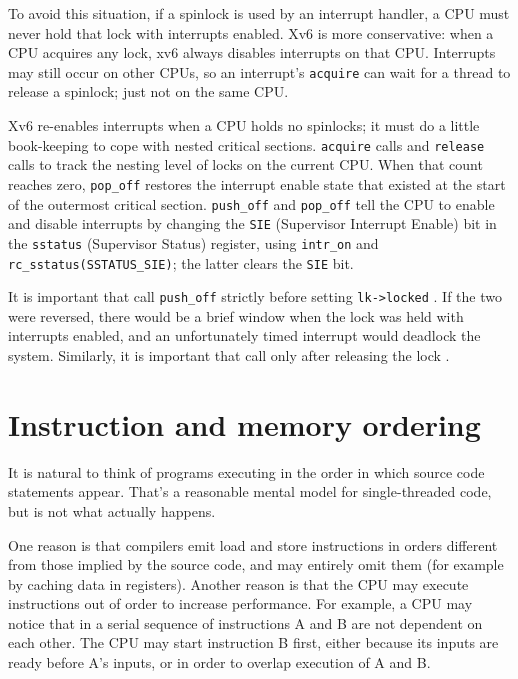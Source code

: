 To avoid this situation, if a spinlock is used by an interrupt handler,
a CPU must never hold that lock with interrupts enabled.
Xv6 is more conservative: when a CPU acquires any
lock, xv6 always disables interrupts on that CPU.
Interrupts may still occur on other CPUs, so 
an interrupt's
\lstinline{acquire}
can wait for a thread to release a spinlock; just not on the same CPU.

Xv6 re-enables interrupts when a CPU holds no spinlocks; it must
do a little book-keeping to cope with nested critical sections.
\lstinline{acquire}
calls
and
\lstinline{release}
calls
to track the nesting level of locks on the current CPU.
When that count reaches zero,
\lstinline{pop_off} 
restores the interrupt enable state that existed 
at the start of the outermost critical section.
\lstinline{push_off} and \lstinline{pop_off} tell the CPU to enable
and disable interrupts by changing the \lstinline{SIE}
(Supervisor Interrupt Enable)
bit in the \lstinline{sstatus} (Supervisor Status)
register, using \lstinline{intr_on} and \lstinline{rc_sstatus(SSTATUS_SIE)};
the latter clears the \lstinline{SIE} bit.

It is important that
call
\lstinline{push_off}
strictly before setting
\lstinline{lk->locked}
.
If the two were reversed, there would be
a brief window when the lock
was held with interrupts enabled, and
an unfortunately timed interrupt would deadlock the system.
Similarly, it is important that
call
only after 
releasing the lock
.

\section{Instruction and memory ordering}
\label{SEC:MEMORDER}

It is natural to think of programs executing in the order
in which source code statements appear.
That's a reasonable mental model for single-threaded
code, but is not what actually happens.

One reason is that compilers emit load and store
instructions in orders different from those implied
by the source code, and may entirely omit them
(for example by caching data in registers).
Another reason is that the CPU may execute instructions
out of order to increase performance.
For
example, a CPU may notice that in a serial sequence of
instructions A and B are not dependent on each other.
The CPU may start instruction B first, either because its
inputs are ready before A's inputs, or in order to overlap
execution of A and B.

